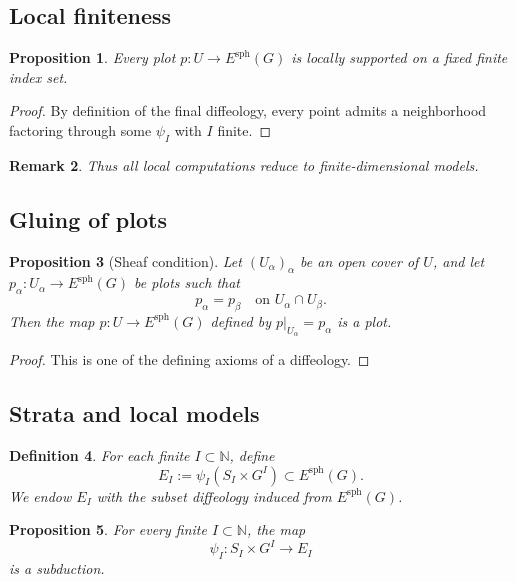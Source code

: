 \documentclass[11pt]{amsart}
\newtheorem{definition}{Definition}[section]
\newtheorem{proposition}[definition]{Proposition}
\newtheorem{remark}[definition]{Remark}
\begin{document}
\subsection{Local finiteness}

\begin{proposition}
Every plot $p : U \to E^{\mathrm{sph}}(G)$ is locally supported on a fixed finite index set.
\end{proposition}

\begin{proof}
By definition of the final diffeology, every point admits a neighborhood factoring through some $\psi_I$ with $I$ finite.
\end{proof}

\begin{remark}
Thus all local computations reduce to finite-dimensional models.
\end{remark}

\subsection{Gluing of plots}

\begin{proposition}[Sheaf condition]
Let $(U_\alpha)_\alpha$ be an open cover of $U$, and let $p_\alpha : U_\alpha \to E^{\mathrm{sph}}(G)$ be plots such that
\[
p_\alpha = p_\beta \quad \text{on } U_\alpha \cap U_\beta.
\]
Then the map $p : U \to E^{\mathrm{sph}}(G)$ defined by $p|_{U_\alpha} = p_\alpha$ is a plot.
\end{proposition}

\begin{proof}
This is one of the defining axioms of a diffeology.
\end{proof}

\subsection{Strata and local models}

\begin{definition}
For each finite \(I\subset \mathbb N\), define
\[
E_I:=\psi_I(S_I\times G^I)\subset E^{\mathrm{sph}}(G).
\]
We endow \(E_I\) with the subset diffeology induced from
\(E^{\mathrm{sph}}(G)\).
\end{definition}

\begin{proposition}
For every finite \(I\subset\mathbb N\), the map
\[
\psi_I:S_I\times G^I\longrightarrow E_I
\]
is a subduction.
\end{proposition}
\end{document}

